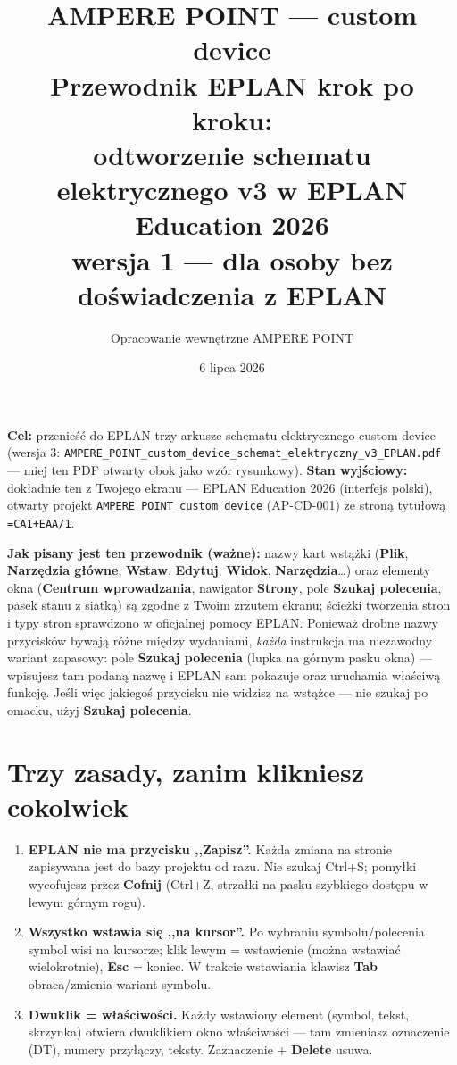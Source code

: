 \documentclass[11pt,a4paper]{article}
\title{\textbf{\color{granat}AMPERE POINT --- custom device}\\[4pt]
\large Przewodnik EPLAN krok po kroku:\\ odtworzenie schematu elektrycznego v3 w EPLAN Education 2026\\[2pt]
\normalsize wersja 1 --- dla osoby bez doświadczenia z EPLAN}
\author{Opracowanie wewnętrzne AMPERE POINT}
\date{6 lipca 2026}
\newcommand{\ui}[1]{\textbf{#1}}                    %
\begin{document}
\maketitle
\vspace{-1.6em}

\noindent\textbf{Cel:} przenieść do EPLAN trzy arkusze schematu elektrycznego custom device
(wersja 3: \texttt{AMPERE\_POINT\_custom\_device\_schemat\_elektryczny\_v3\_EPLAN.pdf} --- miej ten
PDF otwarty obok jako wzór rysunkowy). \textbf{Stan wyjściowy:} dokładnie ten z Twojego ekranu ---
EPLAN Education 2026 (interfejs polski), otwarty projekt \texttt{AMPERE\_POINT\_custom\_device}
(AP-CD-001) ze stroną tytułową \texttt{=CA1+EAA/1}.

\textbf{Jak pisany jest ten przewodnik (ważne):} nazwy kart wstążki (\ui{Plik},
\ui{Narzędzia główne}, \ui{Wstaw}, \ui{Edytuj}, \ui{Widok}, \ui{Narzędzia}\ldots) oraz elementy
okna (\ui{Centrum wprowadzania}, nawigator \ui{Strony}, pole \ui{Szukaj polecenia}, pasek stanu
z siatką) są zgodne z Twoim zrzutem ekranu; ścieżki tworzenia stron i typy stron sprawdzono
w oficjalnej pomocy EPLAN. Ponieważ drobne nazwy przycisków bywają różne między wydaniami,
\emph{każda} instrukcja ma niezawodny wariant zapasowy: pole \ui{Szukaj polecenia} (lupka na
górnym pasku okna) --- wpisujesz tam podaną nazwę i EPLAN sam pokazuje oraz uruchamia właściwą
funkcję. Jeśli więc jakiegoś przycisku nie widzisz na wstążce --- nie szukaj po omacku, użyj
\ui{Szukaj polecenia}.

\tableofcontents

\section{Trzy zasady, zanim klikniesz cokolwiek}

\begin{enumerate}
\item \textbf{EPLAN nie ma przycisku ,,Zapisz''.} Każda zmiana na stronie zapisywana jest do bazy
projektu od razu. Nie szukaj Ctrl+S; pomyłki wycofujesz przez \ui{Cofnij} (Ctrl+Z, strzałki na
pasku szybkiego dostępu w lewym górnym rogu).
\item \textbf{Wszystko wstawia się ,,na kursor''.} Po wybraniu symbolu/polecenia symbol wisi na
kursorze; klik lewym = wstawienie (można wstawiać wielokrotnie), \textbf{Esc} = koniec.
W trakcie wstawiania klawisz \textbf{Tab} obraca/zmienia wariant symbolu.
\item \textbf{Dwuklik = właściwości.} Każdy wstawiony element (symbol, tekst, skrzynka) otwiera
dwuklikiem okno właściwości --- tam zmieniasz oznaczenie (DT), numery przyłączy, teksty.
Zaznaczenie + \textbf{Delete} usuwa.
\end{enumerate}
\end{document}
